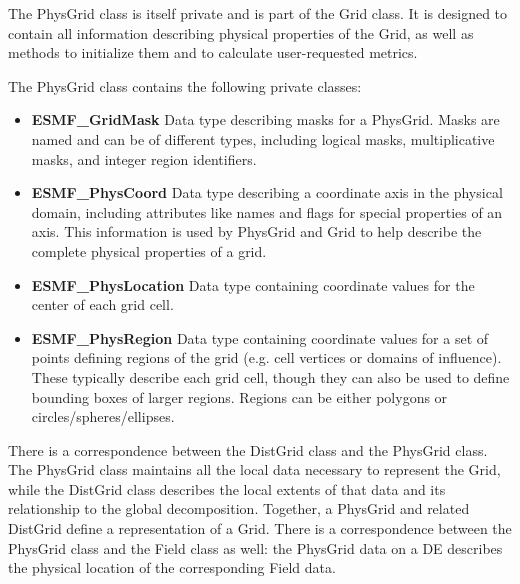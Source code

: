 %



The PhysGrid class is itself private and is part of the Grid
class.  It is designed to contain all information describing physical
properties of the Grid, as well as methods to initialize them and to
calculate user-requested metrics.

The PhysGrid class contains the following private classes:
\begin{itemize}

\item {\bf ESMF\_GridMask} Data type describing masks for a PhysGrid.  Masks
are named and can be of different types, including logical masks,
multiplicative masks, and integer region identifiers.

\item {\bf ESMF\_PhysCoord} Data type describing a coordinate axis in the
physical domain, including attributes like names and flags for special
properties of an axis.  This information is used by PhysGrid and Grid
to help describe the complete physical properties of a grid.

\item {\bf ESMF\_PhysLocation} Data type containing coordinate values for 
the center of each grid cell.

\item {\bf ESMF\_PhysRegion} Data type containing coordinate values for a set
of points defining regions of the grid (e.g. cell vertices or domains of
influence).  These typically describe each grid cell, though they can also be
used to define bounding boxes of larger regions.  Regions can be either
polygons or circles/spheres/ellipses.

\end{itemize}






There is a correspondence between the DistGrid class and the PhysGrid
class.  The PhysGrid class maintains all the local data necessary to
represent the Grid, while the DistGrid class describes the local extents
of that data and its relationship to the global decomposition.
Together, a PhysGrid and related DistGrid define a representation of
a Grid.  There is a correspondence between the PhysGrid class and the Field
class as well:  the PhysGrid data on a DE describes the physical location
of the corresponding Field data.

